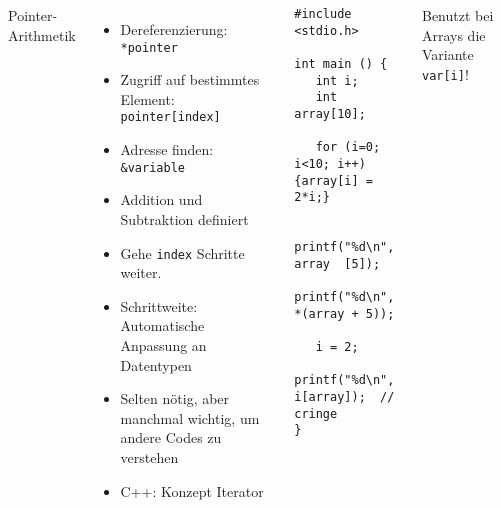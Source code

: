 
\begin{frame}[fragile]
%
\begin{columns}[T]
\begin{Large}
{Pointer-Arithmetik}
\vspace{6pt}
\end{Large}
%
\begin{itemize}
\item Dereferenzierung:					\tabto{3.1cm} \texttt{*pointer}
\item Zugriff auf bestimmtes Element:	\tabto{3.1cm} \texttt{pointer[index]}
\item Adresse finden:					\tabto{3.1cm} \texttt{\&variable}
\item Addition und Subtraktion definiert
\item Gehe \texttt{index} Schritte weiter.
\item Schrittweite: Automatische Anpassung an Datentypen
\item Selten nötig, aber manchmal wichtig, um andere Codes zu verstehen
\item C++: Konzept Iterator
\end{itemize}
%
\begin{codebox}
\begin{verbatim}
#include <stdio.h>

int main () {
   int i;
   int array[10];
	
   for (i=0; i<10; i++) {array[i] = 2*i;}
	
   printf("%d\n",   array  [5]);
   printf("%d\n", *(array + 5));

   i = 2;
   printf("%d\n", i[array]);  // cringe
}
\end{verbatim}
\end{codebox}
%
\begin{hintbox}
\footnotesize Benutzt bei Arrays die Variante \texttt{var[i]}!
\end{hintbox}
\end{columns}
%
\end{frame}


